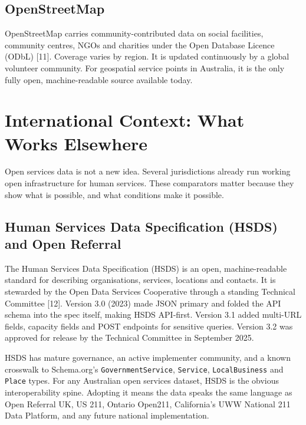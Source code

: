 \documentclass[11pt,a4paper]{article}
\begin{document}
\subsection{OpenStreetMap}

OpenStreetMap carries community-contributed data on social facilities, community centres, NGOs and charities under the Open Database Licence (ODbL) [11]. Coverage varies by region. It is updated continuously by a global volunteer community. For geospatial service points in Australia, it is the only fully open, machine-readable source available today.


\section{International Context: What Works Elsewhere}

Open services data is not a new idea. Several jurisdictions already run working open infrastructure for human services. These comparators matter because they show what is possible, and what conditions make it possible.

\subsection{Human Services Data Specification (HSDS) and Open Referral}

The Human Services Data Specification (HSDS) is an open, machine-readable standard for describing organisations, services, locations and contacts. It is stewarded by the Open Data Services Cooperative through a standing Technical Committee [12]. Version 3.0 (2023) made JSON primary and folded the API schema into the spec itself, making HSDS API-first. Version 3.1 added multi-URL fields, capacity fields and POST endpoints for sensitive queries. Version 3.2 was approved for release by the Technical Committee in September 2025.

HSDS has mature governance, an active implementer community, and a known crosswalk to Schema.org's \texttt{GovernmentService}, \texttt{Service}, \texttt{LocalBusiness} and \texttt{Place} types. For any Australian open services dataset, HSDS is the obvious interoperability spine. Adopting it means the data speaks the same language as Open Referral UK, US 211, Ontario Open211, California's UWW National 211 Data Platform, and any future national implementation.
\end{document}
